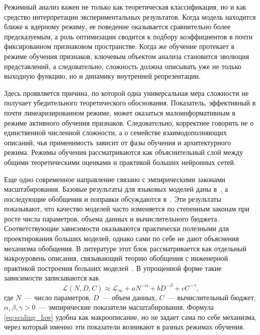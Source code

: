 Режимный анализ важен не только как теоретическая классификация, но и как средство интерпретации экспериментальных результатов.
Когда модель находится ближе к ядерному режиму, ее поведение оказывается сравнительно более предсказуемым, а роль оптимизации сводится к подбору коэффициентов в почти фиксированном признаковом пространстве.
Когда же обучение протекает в режиме обучения признаков, ключевым объектом анализа становится эволюция представлений, а следовательно, сложность должна описывать уже не только выходную функцию, но и динамику внутренней репрезентации.

Здесь проявляется причина, по которой одна универсальная мера сложности не получает убедительного теоретического обоснования.
Показатель, эффективный в почти линеаризированном режиме, может оказаться малоинформативным в режиме активного обучения признаков.
Следовательно, корректнее говорить не о единственной численной сложности, а о семействе взаимодополняющих описаний, чья применимость зависит от фазы обучения и архитектурного режима.
Режимы обучения рассматриваются как объяснительный слой между общими теоретическими оценками и практикой больших нейронных сетей.

Еще одно современное направление связано с эмпирическими законами масштабирования. Базовые результаты для языковых моделей даны в~\cite{kaplan2020scaling,hoffman2022training}, а последующие обобщения и поправки обсуждаются в~\cite{meta2024survey,beyondChinchillaInference2023}.
Эти результаты показывают, что качество моделей часто изменяется по степенным законам при росте числа параметров, объема данных и вычислительного бюджета.
Соответствующие зависимости оказываются практически полезными для проектирования больших моделей, однако сами по себе не дают объяснения механизма обобщения.
В литературе этот блок рассматривается как отдельный макроуровень описания, связывающий теорию обобщения с инженерной практикой построения больших моделей~\cite{hu2021complexitysurvey,recent2020theory,belkin2021overview}.
В упрощенной форме такие зависимости записываются как
\begin{equation}
\mathcal L(N,D,C)\approx
\mathcal L_{\infty}+aN^{-\alpha}+bD^{-\beta}+cC^{-\gamma},
\label{eq:scaling_law}
\end{equation}
где $N$~--- число параметров, $D$~--- объем данных, $C$~--- вычислительный бюджет, $\alpha,\beta,\gamma>0$~--- эмпирические показатели масштабирования. Формула \eqref{eq:scaling_law} удобна как макроописание, но не задает сама по себе механизма, через который именно эти показатели возникают в разных режимах обучения.

